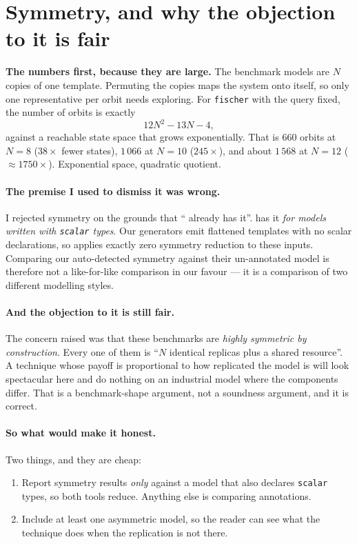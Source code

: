 \section{Symmetry, and why the objection to it is fair \hfill \open{}}

\textbf{The numbers first, because they are large.} The benchmark models are $N$ copies of one
template. Permuting the copies maps the system onto itself, so only one representative per orbit
needs exploring. For \texttt{fischer} with the query fixed, the number of orbits is exactly
\[
  12N^2 - 13N - 4 ,
\]
against a reachable state space that grows exponentially. That is $660$ orbits at $N=8$
($38\times$ fewer states), $1\,066$ at $N=10$ ($245\times$), and about $1\,568$ at $N=12$
($\approx 1750\times$). Exponential space, quadratic quotient.

\paragraph{The premise I used to dismiss it was wrong.} I rejected symmetry on the grounds that
``\uppaal{} already has it''. \uppaal{} has it \emph{for models written with \texttt{scalar} types}.
Our generators emit flattened templates with no scalar declarations, so \verifyta{} applies exactly
zero symmetry reduction to these inputs. Comparing our auto-detected symmetry against their
un-annotated model is therefore not a like-for-like comparison in our favour --- it is a comparison
of two different modelling styles.

\paragraph{And the objection to it is still fair.} The concern raised was that these benchmarks are
\emph{highly symmetric by construction}. Every one of them is ``$N$ identical replicas plus a shared
resource''. A technique whose payoff is proportional to how replicated the model is will look
spectacular here and do nothing on an industrial model where the components differ. That is a
benchmark-shape argument, not a soundness argument, and it is correct.

\paragraph{So what would make it honest.} Two things, and they are cheap:
\begin{enumerate}
\item Report symmetry results \emph{only} against a \uppaal{} model that also declares
      \texttt{scalar} types, so both tools reduce. Anything else is comparing annotations.
\item Include at least one asymmetric model, so the reader can see what the technique does when
      the replication is not there.
\end{enumerate}

